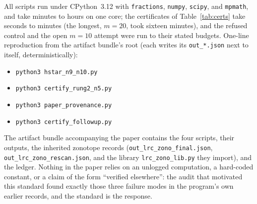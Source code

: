 All scripts run under CPython~3.12 with \texttt{fractions},
\texttt{numpy}, \texttt{scipy}, and \texttt{mpmath}, and take minutes
to hours on one core; the certificates of Table~\ref{tab:certs} take
seconds to minutes (the longest, $m=20$, took sixteen minutes), and the
refused control and the open $m=10$ attempt were run to their stated
budgets. One-line reproduction from the artifact bundle's root (each
writes its \texttt{out\_*.json} next to itself, deterministically):
\begin{itemize}[leftmargin=2.2em,itemsep=1pt,topsep=2pt]
\item \texttt{python3 hstar\_n9\_n10.py}
\item \texttt{python3 certify\_rung2\_n5.py}
\item \texttt{python3 paper\_provenance.py}
\item \texttt{python3 certify\_followup.py}
\end{itemize} The artifact
bundle accompanying the paper contains the four scripts, their outputs,
the inherited zonotope records
(\texttt{out\_lrc\_zono\_final.json},
\texttt{out\_lrc\_zono\_rescan.json}, and the library
\texttt{lrc\_zono\_lib.py} they import), and the ledger. Nothing in the
paper relies on an unlogged computation, a hard-coded constant, or a
claim of the form ``verified elsewhere'': the audit that motivated this
standard found exactly those three failure modes in the program's own
earlier records, and the standard is the response.
